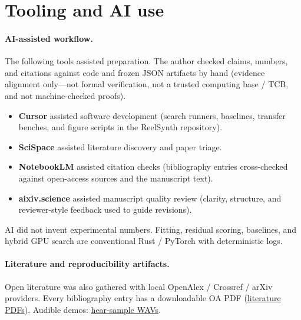 \section{Tooling and AI use}
\label{sec:tooling}

\paragraph{AI-assisted workflow.}
The following tools assisted preparation.
The author checked claims, numbers, and citations against code and frozen JSON artifacts by hand
(evidence alignment only---not formal verification, not a trusted computing base / TCB, and not machine-checked proofs).
\begin{itemize}
  \item \textbf{Cursor} assisted software development (search runners, baselines, transfer benches, and figure scripts in the ReelSynth repository).
  \item \textbf{SciSpace} assisted literature discovery and paper triage.
  \item \textbf{NotebookLM} assisted citation checks (bibliography entries cross-checked against open-access sources and the manuscript text).
  \item \textbf{aixiv.science} assisted manuscript quality review (clarity, structure, and reviewer-style feedback used to guide revisions).
\end{itemize}
AI did not invent experimental numbers.
Fitting, residual scoring, baselines, and hybrid GPU search are conventional Rust / PyTorch with deterministic logs.

\paragraph{Literature and reproducibility artifacts.}
Open literature was also gathered with local OpenAlex / Crossref / arXiv providers. Every bibliography entry has a downloadable OA PDF
(\href{https://github.com/reeldemo/denoise-opt-meta/tree/master/artifacts/literature_oa/pdfs}{literature PDFs}).
Audible demos:
\href{https://github.com/reeldemo/reelsynth/tree/main/brand/artifacts/meta_approach_compare/hear_samples}{hear-sample WAVs}.
